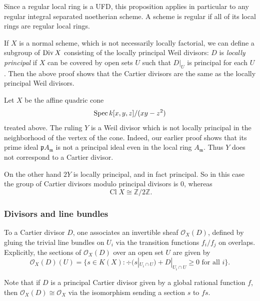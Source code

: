 \documentclass[12pt]{article}
\begin{document}
\begin{remark}
    Since a regular local ring is a UFD, this proposition applies in particular to any regular integral separated noetherian scheme. A scheme is regular if all of its local rings are regular local rings.
\end{remark}

\begin{remark}
    If \(X\) is a normal scheme, which is not necessarily locally factorial, we can define a subgroup of \(\operatorname{Div} X\) consisting of the locally principal Weil divisors: \(D\) is \emph{locally principal} if \(X\) can be covered by open sets \(U\) such that \(D|_U\) is principal for each \(U\). Then the above proof shows that the Cartier divisors are the same as the locally principal Weil divisors.
\end{remark}

\begin{example}
    Let \(X\) be the affine quadric cone
    \[
        \operatorname{Spec} k[x,y,z]/(xy - z^2)
    \]
    treated above. The ruling \(Y\) is a Weil divisor which is not locally principal in the neighborhood of the vertex of the cone. Indeed, our earlier proof shows that its prime ideal \(\mathfrak p A_{\mathfrak m}\) is not a principal ideal even in the local ring \(A_{\mathfrak m}\). Thus \(Y\) does not correspond to a Cartier divisor.

    On the other hand \(2Y\) is locally principal, and in fact principal. So in this case the group of Cartier divisors modulo principal divisors is \(0\), whereas
    \[
        \operatorname{Cl} X \cong \mathbb Z/2\mathbb Z.
    \]
\end{example}

\subsubsection{Divisors and line bundles}
\begin{definition}
    To a Cartier divisor $D$, one associates an invertible sheaf $\mathcal O_X(D)$, defined by gluing the trivial line bundles on $U_i$ via the transition functions $f_i/f_j$ on overlaps. Explicitly, the sections of $\mathcal O_X(D)$ over an open set $U$ are given by
    \[
        \mathcal O_X(D)(U) = \{ s \in K(X) : \div(s|_{U_i \cap U}) + D|_{U_i \cap U} \ge 0 \text{ for all } i \}.
    \]
\end{definition}

Note that if $D$ is a principal Cartier divisor given by a global rational function $f$, then $\mathcal O_X(D) \cong \mathcal O_X$ via the isomorphism sending a section $s$ to $fs$.
\end{document}
